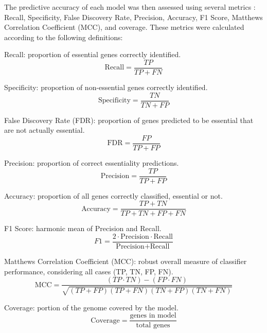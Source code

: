 \documentclass[11pt, a4paper]{article}
\begin{document}
The predictive accuracy of each model was then assessed using several metrics \parencite{tibocha-bonilla-2022}: Recall, Specificity, False Discovery Rate, Precision, Accuracy, F1 Score, Matthews Correlation Coefficient (MCC), and coverage. These metrics were calculated according to the following definitions:

Recall: proportion of essential genes correctly identified.
\begin{equation}
\text{Recall} = \frac{TP}{TP + FN}
\label{eq:1}
\end{equation}

Specificity: proportion of non-essential genes correctly identified.
\begin{equation}
\text{Specificity} = \frac{TN}{TN + FP}
\end{equation}

False Discovery Rate (FDR): proportion of genes predicted to be essential that are not actually essential.
\begin{equation}
\text{FDR} = \frac{FP}{TP + FP}
\end{equation}

Precision: proportion of correct essentiality predictions.
\begin{equation}
\text{Precision} = \frac{TP}{TP + FP}
\end{equation}

Accuracy: proportion of all genes correctly classified, essential or not.
\begin{equation}
\text{Accuracy} = \frac{TP + TN}{TP + TN + FP + FN}
\end{equation}

F1 Score: harmonic mean of Precision and Recall.
\begin{equation}
F1 = \frac{2 \cdot \text{Precision} \cdot \text{Recall}}{\text{Precision} + \text{Recall}}
\end{equation}

Matthews Correlation Coefficient (MCC): robust overall measure of classifier performance, considering all cases (TP, TN, FP, FN).
\begin{equation}
\text{MCC} = 
\frac{(TP \cdot TN) - (FP \cdot FN)}
{\sqrt{(TP + FP)(TP + FN)(TN + FP)(TN + FN)}}
\end{equation}

Coverage: portion of the genome covered by the model.
\begin{equation}
\text{Coverage} = \frac{\text{genes in model}}{\text{total genes}}
\label{eq:6}
\end{equation}
\end{document}
